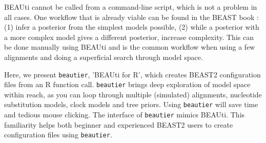 \documentclass{article}
\begin{document}
BEAUti cannot be called from a command-line script, which is not a problem in all cases.
One workflow that is already viable can be found in the BEAST book \cite{drummond2015bayesian}:
(1) infer a posterior from the simplest models possible, (2) while a posterior with a more complex model gives
a different posterior, increase complexity. This can be done manually using BEAUti and is the common workflow
when using a few alignments and doing a superficial search through model space.  

Here, we present \verb;beautier;, 'BEAUti for R', which 
creates BEAST2 configuration files from an R function call.
\verb;beautier; brings deep exploration of model space within reach,
as you can loop through multiple (simulated) alignments, 
nucleotide substitution models, clock models and tree priors.
Using \verb;beautier; will save time and tedious mouse clicking.
The interface of \verb;beautier; mimics BEAUti. This
familiarity helps both beginner and experienced BEAST2 users 
to create configuration files using \verb;beautier;.
\end{document}
